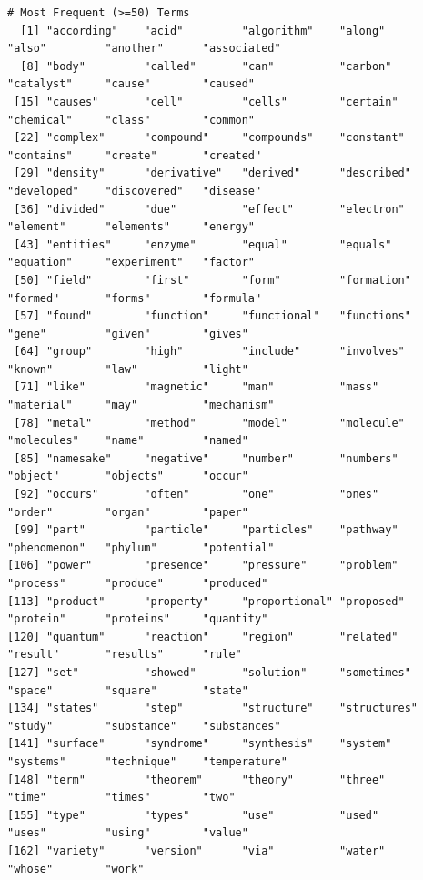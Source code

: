 \documentclass[12pt, oneside]{article}
\begin{document}
\begin{lstlisting}
# Most Frequent (>=50) Terms
  [1] "according"    "acid"         "algorithm"    "along"        "also"         "another"      "associated"  
  [8] "body"         "called"       "can"          "carbon"       "catalyst"     "cause"        "caused"      
 [15] "causes"       "cell"         "cells"        "certain"      "chemical"     "class"        "common"      
 [22] "complex"      "compound"     "compounds"    "constant"     "contains"     "create"       "created"     
 [29] "density"      "derivative"   "derived"      "described"    "developed"    "discovered"   "disease"     
 [36] "divided"      "due"          "effect"       "electron"     "element"      "elements"     "energy"      
 [43] "entities"     "enzyme"       "equal"        "equals"       "equation"     "experiment"   "factor"      
 [50] "field"        "first"        "form"         "formation"    "formed"       "forms"        "formula"     
 [57] "found"        "function"     "functional"   "functions"    "gene"         "given"        "gives"       
 [64] "group"        "high"         "include"      "involves"     "known"        "law"          "light"       
 [71] "like"         "magnetic"     "man"          "mass"         "material"     "may"          "mechanism"   
 [78] "metal"        "method"       "model"        "molecule"     "molecules"    "name"         "named"       
 [85] "namesake"     "negative"     "number"       "numbers"      "object"       "objects"      "occur"       
 [92] "occurs"       "often"        "one"          "ones"         "order"        "organ"        "paper"       
 [99] "part"         "particle"     "particles"    "pathway"      "phenomenon"   "phylum"       "potential"   
[106] "power"        "presence"     "pressure"     "problem"      "process"      "produce"      "produced"    
[113] "product"      "property"     "proportional" "proposed"     "protein"      "proteins"     "quantity"    
[120] "quantum"      "reaction"     "region"       "related"      "result"       "results"      "rule"        
[127] "set"          "showed"       "solution"     "sometimes"    "space"        "square"       "state"       
[134] "states"       "step"         "structure"    "structures"   "study"        "substance"    "substances"  
[141] "surface"      "syndrome"     "synthesis"    "system"       "systems"      "technique"    "temperature" 
[148] "term"         "theorem"      "theory"       "three"        "time"         "times"        "two"         
[155] "type"         "types"        "use"          "used"         "uses"         "using"        "value"       
[162] "variety"      "version"      "via"          "water"        "whose"        "work"  
\end{lstlisting}
\end{document}
